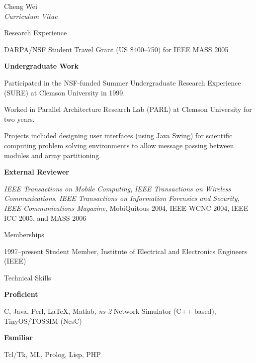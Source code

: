 \documentclass[10pt]{article}
\newenvironment{sublist}{%
	\begin{list}{}{%
		\setlength{\itemsep}{0em}\setlength{\parsep}{0em}%
		\setlength{\topsep}{0em}\setlength{\parskip}{0em}%
	}%
}%
{ \end{list} }
\newenvironment{subbulletlist}{%
	\begin{list}{\labelitemii}{%
		\setlength{\topsep}{\itemsep}\setlength{\parskip}{\parsep}%
	}%
}%
{ \end{list} }
\begin{document}
\begin{cv}{Cheng Wei\\{\large \itshape Curriculum Vitae}}
\begin{cvlist}{Research Experience}
\begin{subbulletlist}
		\item DARPA/NSF Student Travel Grant (US \$400--750) for IEEE MASS 2005
	\end{subbulletlist}
 {
\pagebreak
}{}
	\item \textbf{Undergraduate Work}
	\begin{subbulletlist}
		\item Participated in the NSF-funded Summer Undergraduate 
		Research Experience (SURE) at Clemson University in 1999.
		\item Worked in Parallel Architecture Research Lab (PARL) 
		at Clemson University for two years.
		\item Projects included designing user interfaces (using Java Swing)
		for scientific
		computing problem solving environments to allow message passing
		between modules and array partitioning.
	\end{subbulletlist}
	\item \textbf{External Reviewer}
	\begin{sublist}
		\item \textit{IEEE Transactions on Mobile Computing}, 
		\textit{IEEE Transactions on Wireless Communications}, 
		\textit{IEEE Transactions on Information Forensics and
		Security}, \textit{IEEE Communications Magazine}, 
		MobiQuitous 2004, IEEE WCNC 2004, IEEE ICC 2005, and MASS 2006  
	\end{sublist}
\end{cvlist}
\setlength{\cvlabelwidth}{\oldcvlabelwidth}

\begin{cvlist}{Memberships}
	\item[1997--present] Student Member, Institute of Electrical and
	Electronics Engineers (IEEE)
\end{cvlist}

\setlength{\oldcvlabelwidth}{\cvlabelwidth}
\setlength{\cvlabelwidth}{1em}
\begin{cvlist}{Technical Skills}
	\item \textbf{Proficient}
	\begin{sublist}
		\item C, Java, Perl, LaTeX, Matlab, 
		\textit{ns-2} Network Simulator (C++ based), TinyOS/TOSSIM (NesC)
	\end{sublist}
	\item \textbf{Familiar} 
	\begin{sublist}
		\item Tcl/Tk, ML, Prolog, Lisp, PHP
	\end{sublist}
\end{cvlist}
\setlength{\cvlabelwidth}{\oldcvlabelwidth}


\end{cv}
\end{document}
